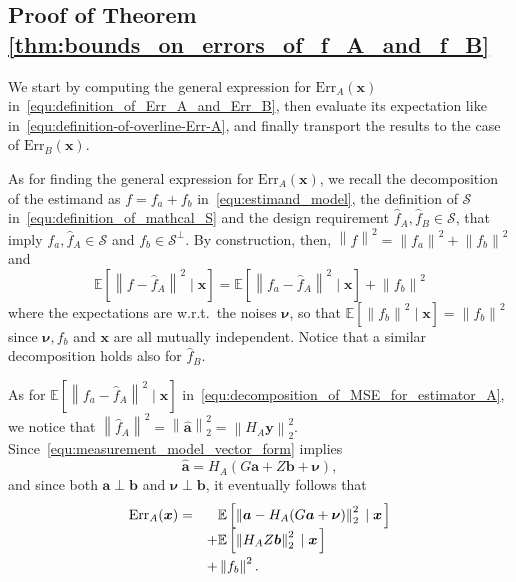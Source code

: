 \documentclass[10pt,twocolumn,twoside]{IEEEtran}					%
\theoremstyle	{plain}
\newcommand{\Expectation}					[0]	{\mathbb{E}}
\newcommand{\ExpectationOf}					[1]	{\Expectation \left[ #1 \right]}
\newcommand{\ExpectationOfGiven}			[2]	{\ExpectationOf{ #1 \; \left| \; #2 \right. }}
\begin{document}
\subsection{Proof of Theorem \ref{thm:bounds_on_errors_of_f_A_and_f_B}} 

We start by computing the general expression for $\mathrm{Err}_{A}(\bm{x})$ in~\eqref{equ:definition_of_Err_A_and_Err_B}, then evaluate its expectation like in~\eqref{equ:definition-of-overline-Err-A}, and finally transport the results to the case of $\mathrm{Err}_{B}(\bm{x})$.

As for finding the general expression for $\mathrm{Err}_{A}(\bm{x})$, we recall the decomposition of the estimand as $f = f_{a} + f_{b}$ in~\eqref{equ:estimand_model}, the definition of $\mathcal{S}$ in~\eqref{equ:definition_of_mathcal_S} and the design requirement $\widehat{f}_{A}, \widehat{f}_{B} \in \mathcal{S}$, that imply $f_{a}, \widehat{f}_{A} \in \mathcal{S}$ and $f_{b} \in \mathcal{S}^{\perp}$. By construction, then, $\left\| f \right\|^{2} = \left\| f_{a} \right\|^{2} + \left\| f_{b} \right\|^{2}$ and
%
\begin{equation}
	\ExpectationOfGiven{ \left\| f - \widehat{f}_{A} \right\|^{2} }{\bm{x}}
	=
	\ExpectationOfGiven{ \left\| f_{a} - \widehat{f}_{A} \right\|^{2} }{\bm{x}}
	+
	\left\| f_{b} \right\|^{2}
	\label{equ:decomposition_of_MSE_for_estimator_A}
\end{equation}
%
where the expectations are w.r.t.\ the noises $\bm{\nu}$, so that $\ExpectationOfGiven{\left\| f_{b} \right\|^{2}}{\bm{x}} = \left\| f_{b} \right\|^{2}$ since 
$\bm{\nu},f_{b}$ and $\bm{x}$ are all mutually independent. Notice that a similar decomposition holds also for $\widehat{f}_{B}$.

As for $\ExpectationOfGiven{ \left\| f_{a} - \widehat{f}_{A} \right\|^{2} }{\bm{x}}$ in~\eqref{equ:decomposition_of_MSE_for_estimator_A}, we notice that $\left\| \widehat{f}_{A} \right\|^{2} = \left\| \widehat{\bm{a}} \right\|^{2}_{2} = \left\| H_{A} \bm{y} \right\|^{2}_{2}$. Since~\eqref{equ:measurement_model_vector_form} implies
%
\begin{equation}
	\widehat{\bm{a}}
	=
	H_{A}
	\left(
		G \bm{a} 
		+
		Z \bm{b}
		+
		\bm{\nu}
	\right) ,
\end{equation}
%
and since both $\bm{a} \perp \bm{b}$ and $\bm{\nu} \perp \bm{b}$, it eventually follows that
%
\begin{equation}
	\begin{array}{ll}
		\mathrm{Err}_{A}(\bm{x})
		= & \phantom{+}
		 \ExpectationOfGiven{ \left\| \bm{a} - H_{A} ( G \bm{a} + \bm{\nu} ) \right\|^{2}_{2} }{\bm{x}} \\ & \vspace{0.1cm}
		+ \ExpectationOfGiven{ \left\| H_{A} Z \bm{b} \right\|^{2}_{2} }{\bm{x}} \\ &
		+  \left\| f_{b} \right\|^{2}.
	\end{array}
	\label{equ:summary_of_MSE_of_estimator_A}
\end{equation}
\end{document}

